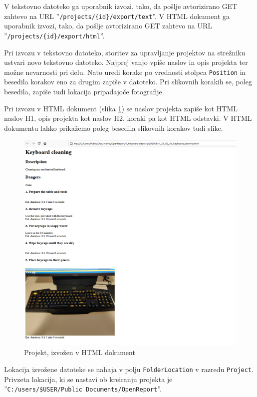 \documentclass[a4paper, 12pt]{book}
\begin{document}
V tekstovno datoteko ga uporabnik izvozi, tako, da pošlje avtorizirano GET zahtevo na URL ''\texttt{/projects/\{id\}/export/text}''.
V HTML dokument ga uporabnik izvozi, tako, da pošlje avtorizirano GET zahtevo na URL ''\texttt{/projects/\{id\}/export/html}''.

Pri izvozu v tekstovno datoteko, storitev za upravljanje projektov na strežniku ustvari novo tekstovno datoteko.
Najprej vanjo vpiše naslov in opis projekta ter možne nevarnosti pri delu.
Nato uredi korake po vrednosti stolpca \texttt{Position} in besedila korakov eno za drugim zapiše v datoteko.
Pri slikovnih korakih se, poleg besedila, zapiše tudi lokacija pripadajoče fotografije.

Pri izvozu v HTML dokument (slika \ref{export_html}) se naslov projekta zapiše kot HTML naslov H1, opis projekta kot naslov H2, koraki pa kot HTML odstavki.
V HTML dokumentu lahko prikažemo poleg besedila slikovnih korakov tudi slike.

\begin{figure}[H]
\begin{center}
\includegraphics[width=13cm]{export_html}
\end{center}
\caption{Projekt, izvožen v HTML dokument}
\label{export_html}
\end{figure}

Lokacija izvožene datoteke se nahaja v polju \texttt{FolderLocation} v razredu \texttt{Project}.
Privzeta lokacija, ki se nastavi ob kreiranju projekta je 
\\''\texttt{C:/users/\$USER/Public Documents/OpenReport}''.
\end{document}
